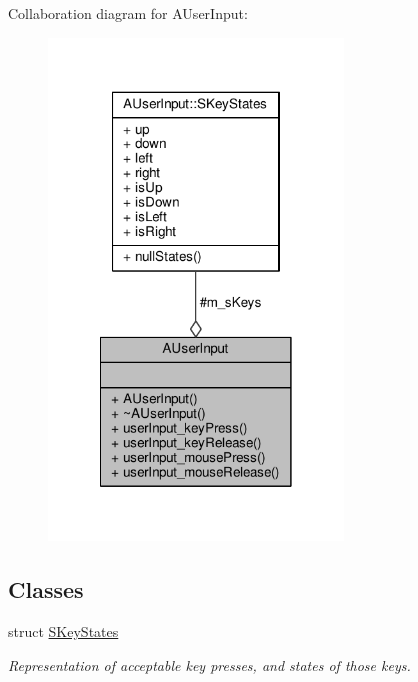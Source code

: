 Collaboration diagram for A\-User\-Input\-:
\nopagebreak
\begin{figure}[H]
\begin{center}
\leavevmode
\includegraphics[width=222pt]{classAUserInput__coll__graph}
\end{center}
\end{figure}
\subsection*{Classes}
\begin{DoxyCompactItemize}
\item 
struct \hyperlink{structAUserInput_1_1SKeyStates}{S\-Key\-States}
\begin{DoxyCompactList}\small\item\em Representation of acceptable key presses, and states of those keys. \end{DoxyCompactList}\end{DoxyCompactItemize}

